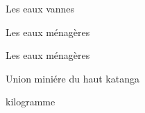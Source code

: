  \begin{description}[leftmargin=*, widest=DCCHTM]
    
        \item[EV]
        Les eaux vannes 
        
        \item[EM]
        Les eaux ménagères 
        
        \item[EU]
        Les eaux ménagères 
        
        \item[UMHK]
        Union miniére du haut katanga
    
        \item[Kg]
        kilogramme
        
 \end{description}